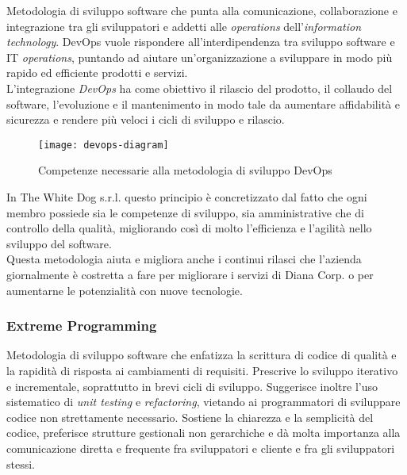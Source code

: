 Metodologia di sviluppo software che punta alla comunicazione, collaborazione e integrazione tra gli sviluppatori e addetti alle \textit{operations} dell'\textit{information technology}. DevOps vuole rispondere all'interdipendenza tra sviluppo software e IT \textit{operations}, puntando ad aiutare un'organizzazione a sviluppare in modo più rapido ed efficiente prodotti e servizi. \\
L'integrazione \textit{DevOps} ha come obiettivo il rilascio del prodotto, il collaudo del software, l'evoluzione e il mantenimento in modo tale da aumentare affidabilità e sicurezza e rendere più veloci i cicli di sviluppo e rilascio. 

\label{DevOps}
\begin{figure}[ht]
	\begin{center}
		\texttt{[image: devops-diagram]}
		\caption{Competenze necessarie alla metodologia di sviluppo DevOps}
	\end{center}
\end{figure}
\FloatBarrier

In The White Dog s.r.l. questo principio è concretizzato dal fatto che ogni membro possiede sia le competenze di sviluppo, sia amministrative che di controllo della qualità, migliorando così di molto l'efficienza e l'agilità nello sviluppo del software. \\
Questa metodologia aiuta e migliora anche i continui rilasci che l'azienda giornalmente è costretta a fare per migliorare i servizi di Diana Corp. o per aumentarne le potenzialità con nuove tecnologie.

\subsubsection{Extreme Programming}

Metodologia di sviluppo software che enfatizza la scrittura di codice di qualità e la rapidità di risposta ai cambiamenti di requisiti. Prescrive lo sviluppo iterativo e incrementale, soprattutto in brevi cicli di sviluppo. Suggerisce inoltre l'uso sistematico di \textit{unit testing} e \textit{refactoring}, vietando ai programmatori di sviluppare codice non strettamente necessario. Sostiene la chiarezza e la semplicità del codice, preferisce strutture gestionali non gerarchiche e dà molta importanza  alla comunicazione diretta e frequente fra sviluppatori e cliente e fra gli sviluppatori stessi. 

